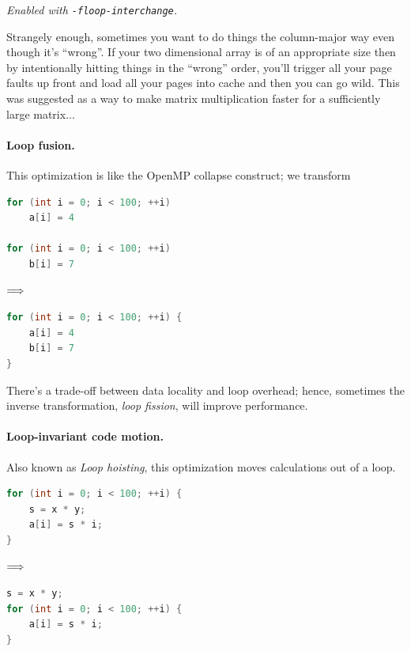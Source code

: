 \documentclass[a4paper]{report}
\begin{document}
\noindent
\emph{Enabled with {\tt -floop-interchange}.}

Strangely enough, sometimes you want to do things the column-major way even though it's ``wrong''. If your two dimensional array is of an appropriate size then by intentionally hitting things in the ``wrong'' order, you'll trigger all your page faults up front and load all your pages into cache and then you can go wild. This was suggested as a way to make matrix multiplication faster for a sufficiently large matrix...

\paragraph{Loop fusion.} This optimization is like the OpenMP collapse
construct; we transform
\begin{center}
\vspace*{-1em}
\begin{minipage}{.3\textwidth}
  \begin{lstlisting}[language=C]
for (int i = 0; i < 100; ++i)
    a[i] = 4

for (int i = 0; i < 100; ++i)
    b[i] = 7
  \end{lstlisting}
  \end{minipage} $\Longrightarrow \hspace*{2em}$ \begin{minipage}{.4\textwidth}
  \begin{lstlisting}[language=C]
for (int i = 0; i < 100; ++i) {
    a[i] = 4
    b[i] = 7
}
  \end{lstlisting}
  \end{minipage}
  \end{center}
There's a trade-off between data locality and loop overhead; hence,
sometimes the inverse transformation, \emph{loop fission}, will
improve performance.

\paragraph{Loop-invariant code motion.} Also known as \emph{Loop hoisting},
this optimization moves calculations out of a loop. 
\begin{center}
\vspace*{-1em}
\begin{minipage}{.3\textwidth}
  \begin{lstlisting}[language=C]
for (int i = 0; i < 100; ++i) {
    s = x * y;
    a[i] = s * i;
}
  \end{lstlisting}
  \end{minipage} $\Longrightarrow \hspace*{2em}$ \begin{minipage}{.4\textwidth}
  \begin{lstlisting}[language=C]
s = x * y;
for (int i = 0; i < 100; ++i) {
    a[i] = s * i;
}
  \end{lstlisting}
  \end{minipage}
  \end{center}
\end{document}
